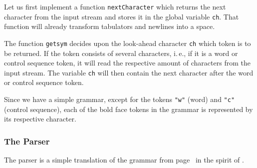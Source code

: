 \documentclass[a4paper]{article} %
\newcommand{\ie}{i.\,e.}
\begin{document}
Let us first implement a function \texttt{nextCharacter} which returns
the next character from the input stream and stores it in the global
variable \texttt{ch}. That function will already transform tabulators and
newlines into a space.


The function \texttt{getsym} decides upon the look-ahead character
\texttt{ch} which token is to be returned. If the token consists of
several characters, \ie, if it is a word or control sequence token, it
will read the respective amount of characters from the input stream.
The variable \texttt{ch} will then contain the next character after
the word or control sequence token.

Since we have a simple grammar, except for the tokens \verb|"w"|
(word) and \verb|"c"| (control sequence), each of the bold face
tokens in the grammar is represented by its respective character.

\subsubsection{The Parser}

The parser is a simple translation of the grammar from
page~\pageref{grammar} in the spirit of \cite[pp.~9--20]{Wirth:2005}.
\end{document}
